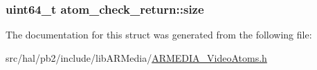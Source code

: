 \subsubsection[{\texorpdfstring{size}{size}}]{\setlength{\rightskip}{0pt plus 5cm}uint64\+\_\+t atom\+\_\+check\+\_\+return\+::size}\hypertarget{structatom__check__return_a148c2afad99e3fd63bb3d75bc88ce665}{}\label{structatom__check__return_a148c2afad99e3fd63bb3d75bc88ce665}


The documentation for this struct was generated from the following file\+:\begin{DoxyCompactItemize}
\item 
src/hal/pb2/include/lib\+A\+R\+Media/\hyperlink{_a_r_m_e_d_i_a___video_atoms_8h}{A\+R\+M\+E\+D\+I\+A\+\_\+\+Video\+Atoms.\+h}\end{DoxyCompactItemize}

